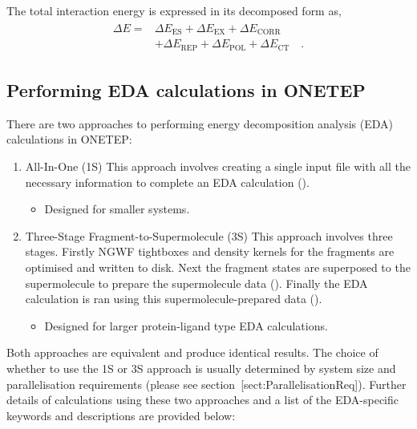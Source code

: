 \documentclass[letterpaper,10pt,english]{sphinxmanual}
\begin{document}
The total interaction energy is expressed in its decomposed form as,
\begin{equation*}
\begin{split}\begin{aligned}
 \Delta E =& \Delta E_\mathrm{ES} + \Delta E_\mathrm{EX} + \Delta E_\mathrm{CORR} \nonumber \\
       &+ \Delta E_\mathrm{REP} + \Delta E_\mathrm{POL} + \Delta E_\mathrm{CT} \quad .\end{aligned}\end{split}
\end{equation*}

\subsection{Performing EDA calculations in ONETEP}
\label{\detokenize{EDA:performing-eda-calculations-in-onetep}}
There are two approaches to performing energy decomposition analysis
(EDA) calculations in ONETEP:
\begin{enumerate}
\item {} 
All-In-One (1S) This approach involves creating a single input file
with all the necessary information to complete an EDA calculation
().
\begin{itemize}
\item {} 
Designed for smaller systems.

\end{itemize}

\item {} 
Three-Stage Fragment-to-Supermolecule (3S) This approach involves
three stages. Firstly NGWF tightboxes and density kernels for the
fragments are optimised and written to disk. Next the fragment states
are superposed to the supermolecule to prepare the supermolecule data
(). Finally the EDA calculation is ran using this
supermolecule-prepared data ().
\begin{itemize}
\item {} 
Designed for larger protein-ligand type EDA calculations.

\end{itemize}

\end{enumerate}

Both approaches are equivalent and produce identical results. The choice
of whether to use the 1S or 3S approach is usually determined by system
size and parallelisation requirements (please see
section {[}sect:ParallelisationReq{]}). Further details of calculations
using these two approaches and a list of the EDA-specific keywords and
descriptions are provided below:
\end{document}
